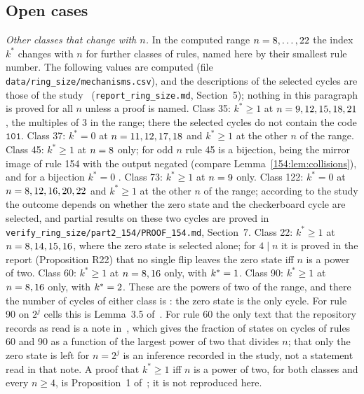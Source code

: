 \documentclass[10pt,a4paper]{article}
\newcommand{\kst}{k^{*}}
\newcommand{\code}[1]{\mathtt{#1}}            %
\begin{document}
\subsection{Open cases}\label{sec:open}

\emph{Other classes that change with $n$.}
In the computed range $n=8,\dots,22$ the index $\kst$ changes with $n$ for \NumOtherSwitching{}
further classes of rules, named here by their smallest rule number. The following values are computed (file
\texttt{data/ring\_size/mechanisms.csv}), and the descriptions of the selected cycles are those of the
study~\cite{PeterleinStudy} (\texttt{report\_ring\_size.md}, Section~5); nothing in this paragraph is proved for all
$n$ unless a proof is named.
Class 35: $\kst\ge1$ at $n=9, 12, 15, 18, 21$, the multiples of $3$ in the range; there the selected cycles do not
contain the code $\code{101}$. Class 37: $\kst=0$ at $n=11, 12, 17, 18$ and $\kst\ge1$ at the other $n$ of the
range. Class 45: $\kst\ge1$ at $n=8$ only; for odd $n$ rule 45 is a bijection, being the mirror image of rule 154 with the output negated (compare Lemma~\ref{154:lem:collisions}), and for a bijection $\kst=0$
\cite{PeterleinNote}. Class 73: $\kst\ge1$ at $n=9$ only. Class 122: $\kst=0$ at
$n=8, 12, 16, 20, 22$ and $\kst\ge1$ at the other $n$ of the range; according to the study the outcome depends
on whether the zero state and the checkerboard cycle are selected, and partial results on these two cycles are
proved in
\texttt{verify\_ring\_size/part2\_154/PROOF\_154.md}, Section~7. Class 22: $\kst\ge1$ at $n=8, 14, 15, 16$, where
the zero state is selected alone; for $4\mid n$ it is proved in the report (Proposition R22) that no single flip
leaves the zero state iff $n$ is a power of two. Class 60: $\kst\ge1$ at $n=8, 16$ only, with
$\kst=\KstarSixtyPos$. Class 90: $\kst\ge1$ at $n=8, 16$ only, with $\kst=\KstarNinetyPos$. These are the
powers of two of the range, and there the number of cycles of either class is \CyclesSixtyNinetyPos: the zero state
is the only cycle. For rule 90 on $2^j$ cells this is Lemma~3.5 of~\cite{MartinOdlyzkoWolfram1984}. For rule 60 the
only text that the repository records as read is a note in~\cite[p.~963]{Wolfram2002}, which gives the fraction of
states on cycles of rules 60 and 90 as a function of the largest power of two that divides $n$; that only the zero
state is left for $n=2^j$ is an inference recorded in the study, not a statement read in that note. A proof
that $\kst\ge1$ iff $n$ is a power of two, for both classes and every $n\ge4$, is Proposition~1
of~\cite{PeterleinNote}; it is not reproduced here.
\end{document}
